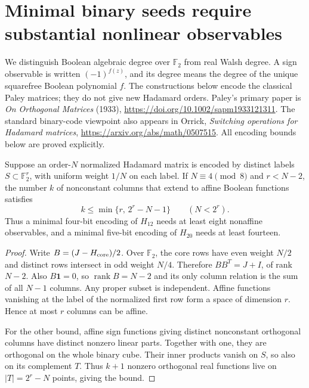 \section{Minimal binary seeds require substantial nonlinear observables}
\label{s18:sec:nonlinear-seeds}
We distinguish Boolean algebraic degree over $\mathbb F_2$ from real
Walsh degree. A sign observable is written $(-1)^{f(z)}$, and its degree
means the degree of the unique squarefree Boolean polynomial $f$.
The constructions below encode the classical Paley matrices; they do
not give new Hadamard orders. Paley's primary paper is
\emph{On Orthogonal Matrices} (1933),
\url{https://doi.org/10.1002/sapm1933121311}. The standard binary-code
viewpoint also appears in Orrick, \emph{Switching operations for Hadamard
matrices}, \url{https://arxiv.org/abs/math/0507515}.
All encoding bounds below are proved explicitly.

\begin{proposition}
\label{s18:prop:nonlinear-affine-budget}
Suppose an order-$N$ normalized Hadamard matrix is encoded by distinct
labels $S\subset\mathbb F_2^r$, with uniform weight $1/N$ on each label.
If $N\equiv4\pmod8$ and $r<N-2$, the number $k$ of nonconstant columns
that extend to affine Boolean functions satisfies
\[
 k\le\min\{r,\,2^r-N-1\}\qquad(N<2^r).
\]
Thus a minimal four-bit encoding of $H_{12}$ needs at least eight
nonaffine observables, and a minimal five-bit encoding of $H_{20}$
needs at least fourteen.
\end{proposition}
\begin{proof}
Write $B=(J-H_{\rm core})/2$. Over $\mathbb F_2$, the core rows have
even weight $N/2$ and distinct rows intersect in odd weight $N/4$.
Therefore $BB^T=J+I$, of rank $N-2$. Also $B\mathbf1=0$, so
$\operatorname{rank}B=N-2$ and its only column relation is the sum
of all $N-1$ columns. Any proper subset is independent. Affine functions
vanishing at the label of the normalized first row form a space of
dimension $r$. Hence at most $r$ columns can be affine.

For the other bound, affine sign functions giving distinct nonconstant
orthogonal columns have distinct nonzero linear parts. Together with
one, they are orthogonal on the whole binary cube. Their inner products
vanish on $S$, so also on its complement $T$. Thus $k+1$ nonzero
orthogonal real functions live on $|T|=2^r-N$ points, giving the bound.
\end{proof}

